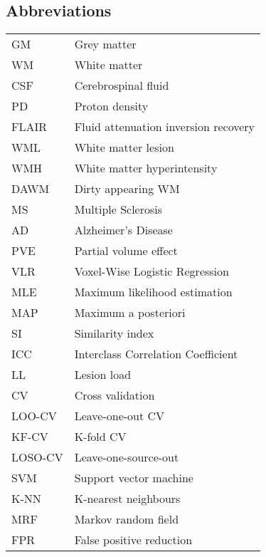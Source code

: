 \begin{singlespacing}
\tableofcontents
\newpage
\listoffigures
\newpage
\listoftables
\newpage
\subsection*{Abbreviations}
\begin{table}[H]
  \begin{tabular}{ll}
  	\hline
  	GM      & Grey matter                          \\
  	WM      & White matter                         \\
  	CSF     & Cerebrospinal fluid                  \\
  	PD      & Proton density                       \\
  	FLAIR   & Fluid attenuation inversion recovery \\
  	WML     & White matter lesion                  \\
  	WMH     & White matter hyperintensity          \\
  	DAWM    & Dirty appearing WM                   \\
  	MS      & Multiple Sclerosis                   \\
  	AD      & Alzheimer's Disease                  \\
  	PVE     & Partial volume effect                \\
  	VLR     & Voxel-Wise Logistic Regression       \\
  	MLE     & Maximum likelihood estimation        \\
  	MAP     & Maximum a posteriori                 \\
  	SI      & Similarity index                     \\
  	ICC     & Interclass Correlation Coefficient   \\
  	LL      & Lesion load                          \\
  	CV      & Cross validation                     \\
  	LOO-CV  & Leave-one-out CV                     \\
  	KF-CV   & K-fold CV                            \\
  	LOSO-CV & Leave-one-source-out                 \\
  	SVM     & Support vector machine               \\
  	K-NN    & K-nearest neighbours                 \\
  	MRF     & Markov random field                  \\
  	FPR     & False positive reduction             \\ \hline
  \end{tabular}
\end{table}
\clearpage

\end{singlespacing}
